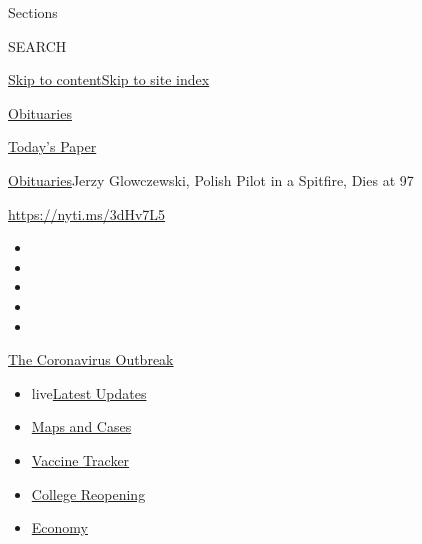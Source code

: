 Sections

SEARCH

\protect\hyperlink{site-content}{Skip to
content}\protect\hyperlink{site-index}{Skip to site index}

\href{https://www.nytimes.com/section/obituaries}{Obituaries}

\href{https://myaccount.nytimes.com/auth/login?response_type=cookie\&client_id=vi}{}

\href{https://www.nytimes.com/section/todayspaper}{Today's Paper}

\href{/section/obituaries}{Obituaries}\textbar{}Jerzy Glowczewski,
Polish Pilot in a Spitfire, Dies at 97

\url{https://nyti.ms/3dHv7L5}

\begin{itemize}
\item
\item
\item
\item
\item
\end{itemize}

\href{https://www.nytimes.com/news-event/coronavirus?action=click\&pgtype=Article\&state=default\&region=TOP_BANNER\&context=storylines_menu}{The
Coronavirus Outbreak}

\begin{itemize}
\tightlist
\item
  live\href{https://www.nytimes.com/2020/08/03/world/coronavirus-covid-19.html?action=click\&pgtype=Article\&state=default\&region=TOP_BANNER\&context=storylines_menu}{Latest
  Updates}
\item
  \href{https://www.nytimes.com/interactive/2020/us/coronavirus-us-cases.html?action=click\&pgtype=Article\&state=default\&region=TOP_BANNER\&context=storylines_menu}{Maps
  and Cases}
\item
  \href{https://www.nytimes.com/interactive/2020/science/coronavirus-vaccine-tracker.html?action=click\&pgtype=Article\&state=default\&region=TOP_BANNER\&context=storylines_menu}{Vaccine
  Tracker}
\item
  \href{https://www.nytimes.com/2020/08/02/us/covid-college-reopening.html?action=click\&pgtype=Article\&state=default\&region=TOP_BANNER\&context=storylines_menu}{College
  Reopening}
\item
  \href{https://www.nytimes.com/live/2020/08/03/business/stock-market-today-coronavirus?action=click\&pgtype=Article\&state=default\&region=TOP_BANNER\&context=storylines_menu}{Economy}
\end{itemize}

